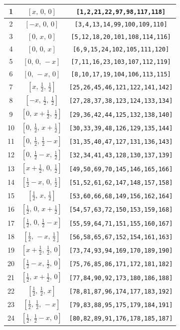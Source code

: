 \documentclass[fleqn,8pt]{jsarticle}
\begin{document}
\begin{longtable}{ccc}
1 & $\left[ x,\, 0,\, 0 \right]$ & {\tt [1,2,21,22,97,98,117,118]} \\ \hline
2 & $\left[ - x,\, 0,\, 0 \right]$ & {\tt [3,4,13,14,99,100,109,110]} \\ \hline
3 & $\left[ 0,\, x,\, 0 \right]$ & {\tt [5,12,18,20,101,108,114,116]} \\ \hline
4 & $\left[ 0,\, 0,\, x \right]$ & {\tt [6,9,15,24,102,105,111,120]} \\ \hline
5 & $\left[ 0,\, 0,\, - x \right]$ & {\tt [7,11,16,23,103,107,112,119]} \\ \hline
6 & $\left[ 0,\, - x,\, 0 \right]$ & {\tt [8,10,17,19,104,106,113,115]} \\ \hline
7 & $\left[ x,\, \frac{1}{2},\, \frac{1}{2} \right]$ & {\tt [25,26,45,46,121,122,141,142]} \\ \hline
8 & $\left[ - x,\, \frac{1}{2},\, \frac{1}{2} \right]$ & {\tt [27,28,37,38,123,124,133,134]} \\ \hline
9 & $\left[ 0,\, x + \frac{1}{2},\, \frac{1}{2} \right]$ & {\tt [29,36,42,44,125,132,138,140]} \\ \hline
10 & $\left[ 0,\, \frac{1}{2},\, x + \frac{1}{2} \right]$ & {\tt [30,33,39,48,126,129,135,144]} \\ \hline
11 & $\left[ 0,\, \frac{1}{2},\, \frac{1}{2} - x \right]$ & {\tt [31,35,40,47,127,131,136,143]} \\ \hline
12 & $\left[ 0,\, \frac{1}{2} - x,\, \frac{1}{2} \right]$ & {\tt [32,34,41,43,128,130,137,139]} \\ \hline
13 & $\left[ x + \frac{1}{2},\, 0,\, \frac{1}{2} \right]$ & {\tt [49,50,69,70,145,146,165,166]} \\ \hline
14 & $\left[ \frac{1}{2} - x,\, 0,\, \frac{1}{2} \right]$ & {\tt [51,52,61,62,147,148,157,158]} \\ \hline
15 & $\left[ \frac{1}{2},\, x,\, \frac{1}{2} \right]$ & {\tt [53,60,66,68,149,156,162,164]} \\ \hline
16 & $\left[ \frac{1}{2},\, 0,\, x + \frac{1}{2} \right]$ & {\tt [54,57,63,72,150,153,159,168]} \\ \hline
17 & $\left[ \frac{1}{2},\, 0,\, \frac{1}{2} - x \right]$ & {\tt [55,59,64,71,151,155,160,167]} \\ \hline
18 & $\left[ \frac{1}{2},\, - x,\, \frac{1}{2} \right]$ & {\tt [56,58,65,67,152,154,161,163]} \\ \hline
19 & $\left[ x + \frac{1}{2},\, \frac{1}{2},\, 0 \right]$ & {\tt [73,74,93,94,169,170,189,190]} \\ \hline
20 & $\left[ \frac{1}{2} - x,\, \frac{1}{2},\, 0 \right]$ & {\tt [75,76,85,86,171,172,181,182]} \\ \hline
21 & $\left[ \frac{1}{2},\, x + \frac{1}{2},\, 0 \right]$ & {\tt [77,84,90,92,173,180,186,188]} \\ \hline
22 & $\left[ \frac{1}{2},\, \frac{1}{2},\, x \right]$ & {\tt [78,81,87,96,174,177,183,192]} \\ \hline
23 & $\left[ \frac{1}{2},\, \frac{1}{2},\, - x \right]$ & {\tt [79,83,88,95,175,179,184,191]} \\ \hline
24 & $\left[ \frac{1}{2},\, \frac{1}{2} - x,\, 0 \right]$ & {\tt [80,82,89,91,176,178,185,187]} \\
\end{longtable}
\end{document}

